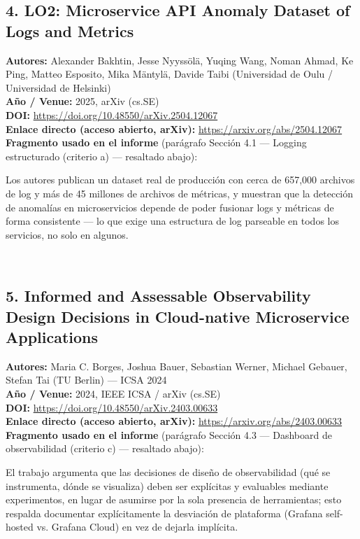 \documentclass[11pt,letterpaper]{article}
\newcommand{\ficha}[7]{%
\subsection*{#1}
\noindent\textbf{Autores:} #2 \\
\textbf{Año / Venue:} #3 \\
\textbf{DOI:} \url{#4} \\
\textbf{Enlace directo (acceso abierto, arXiv):} \url{#5}\\[0.5em]
\noindent\textbf{Fragmento usado en el informe} (parágrafo #6 --- resaltado abajo):\\[0.3em]
\noindent\colorbox{yellow!60}{\parbox{0.94\linewidth}{\vspace{0.3em}#7\vspace{0.3em}}}\\[0.3em]
\noindent\hrulefill
}
\begin{document}
\ficha{4. LO2: Microservice API Anomaly Dataset of Logs and Metrics}
{Alexander Bakhtin, Jesse Nyyssölä, Yuqing Wang, Noman Ahmad, Ke Ping, Matteo Esposito, Mika Mäntylä, Davide Taibi (Universidad de Oulu / Universidad de Helsinki)}
{2025, arXiv (cs.SE)}
{https://doi.org/10.48550/arXiv.2504.12067}
{https://arxiv.org/abs/2504.12067}
{Sección 4.1 --- Logging estructurado (criterio a)}
{Los autores publican un dataset real de producción con cerca de 657{,}000 archivos de log y más de 45 millones de archivos de métricas, y muestran que la detección de anomalías en microservicios depende de poder fusionar logs y métricas de forma consistente --- lo que exige una estructura de log parseable en todos los servicios, no solo en algunos.}

\ficha{5. Informed and Assessable Observability Design Decisions in Cloud-native Microservice Applications}
{Maria C. Borges, Joshua Bauer, Sebastian Werner, Michael Gebauer, Stefan Tai (TU Berlin) --- ICSA 2024}
{2024, IEEE ICSA / arXiv (cs.SE)}
{https://doi.org/10.48550/arXiv.2403.00633}
{https://arxiv.org/abs/2403.00633}
{Sección 4.3 --- Dashboard de observabilidad (criterio c)}
{El trabajo argumenta que las decisiones de diseño de observabilidad (qué se instrumenta, dónde se visualiza) deben ser explícitas y evaluables mediante experimentos, en lugar de asumirse por la sola presencia de herramientas; esto respalda documentar explícitamente la desviación de plataforma (Grafana self-hosted vs. Grafana Cloud) en vez de dejarla implícita.}
\end{document}
